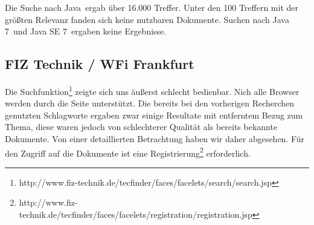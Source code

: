 Die Suche nach \glqq Java\grqq ~ergab über 16.000 Treffer. Unter den 100 Treffern mit der größten Relevanz fanden sich keine nutzbaren Dokumente. Suchen nach \glqq Java 7\grqq ~und \glqq Java SE 7\grqq ~ergaben keine Ergebnisse.

\subsection{FIZ Technik / WFi Frankfurt}
Die Suchfunktion\footnote{http://www.fiz-technik.de/tecfinder/faces/facelets/search/search.jsp} zeigte sich uns äußerst schlecht bedienbar. Nich alle Browser werden durch die Seite unterstützt. Die bereits bei den vorherigen Recherchen genutzten Schlagworte ergaben zwar einige Resultate mit entferntem Bezug zum Thema, diese waren jedoch von schlechterer Qualität als bereits bekannte Dokumente. Von einer detaillierten Betrachtung haben wir daher abgesehen.
Für den Zugriff auf die Dokumente ist eine Registrierung\footnote{http://www.fiz-technik.de/tecfinder/faces/facelets/registration/registration.jsp} erforderlich.
%

